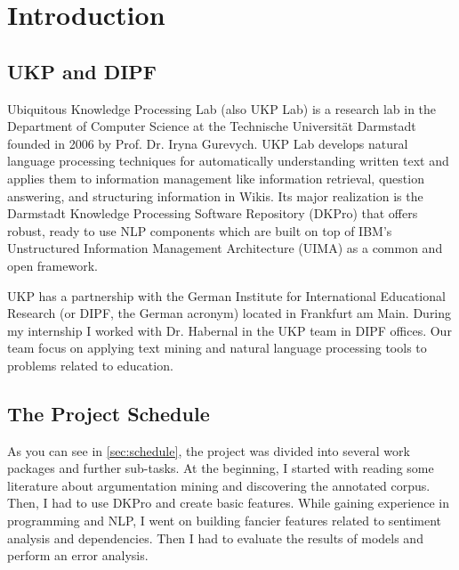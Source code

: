 \chapter*{Introduction}
\section*{UKP and DIPF}
Ubiquitous Knowledge Processing Lab (also UKP Lab) is a research lab in the Department of Computer Science at the Technische Universit\"at Darmstadt founded in 2006 by Prof. Dr. Iryna Gurevych. UKP Lab develops natural language processing techniques for automatically understanding written text and applies them to information management like information retrieval, question answering, and structuring information in Wikis. Its major realization is the Darmstadt Knowledge Processing Software Repository (DKPro) that offers robust, ready to use NLP components which are built on top of IBM’s Unstructured Information Management Architecture (UIMA) as a common and open framework.

UKP has a partnership with the German Institute for International Educational Research (or DIPF, the German acronym) located in Frankfurt am Main. During my internship I worked with Dr. Habernal in the UKP team in DIPF offices. Our team focus on applying text mining and natural language processing tools to problems related to education. 
\section*{The Project Schedule}
As you can see in \cref{sec:schedule}, the project was divided into several work packages and further sub-tasks. At the beginning, I started with reading some literature about argumentation mining and discovering the annotated corpus. Then, I had to use DKPro and create basic features. While gaining experience in programming and NLP, I went on building fancier features related to sentiment analysis and dependencies. Then I had to evaluate the results of models and perform an error analysis.  
